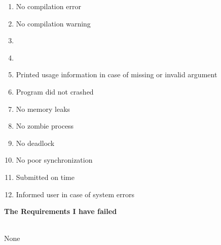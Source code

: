 \documentclass{report}
\begin{document}
\begin{enumerate}
    \item {\large No compilation error }
    \item {\large No compilation warning}
    \item {\large {} }
    \item {\large {}}
    \item {\large Printed usage information in case of missing or invalid argument}
    \item {\large Program did not crashed}
    \item {\large No memory leaks}
    \item {\large No zombie process}
    \item {\large No deadlock}
    \item {\large No poor synchronization}
    \item {\large Submitted on time}
    \item {\large Informed user in case of system errors}
    
\end{enumerate}

{\huge \textbf{The Requirements I have failed} \\}

{\large \\None}
\end{document}
